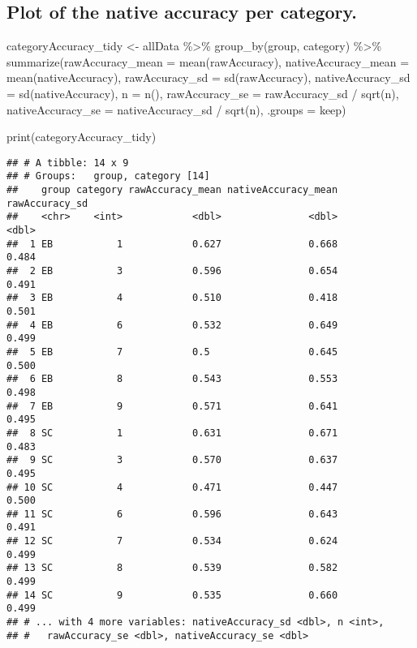 \documentclass[
]{article}
\newenvironment{Shaded}{\begin{snugshade}}{\end{snugshade}}
\newcommand{\AttributeTok}[1]{\textcolor[rgb]{0.77,0.63,0.00}{#1}}
\newcommand{\FunctionTok}[1]{\textcolor[rgb]{0.00,0.00,0.00}{#1}}
\newcommand{\NormalTok}[1]{#1}
\newcommand{\OtherTok}[1]{\textcolor[rgb]{0.56,0.35,0.01}{#1}}
\newcommand{\SpecialCharTok}[1]{\textcolor[rgb]{0.00,0.00,0.00}{#1}}
\newcommand{\StringTok}[1]{\textcolor[rgb]{0.31,0.60,0.02}{#1}}
\begin{document}
\hypertarget{plot-of-the-native-accuracy-per-category.}{%
\subsection{Plot of the native accuracy per
category.}\label{plot-of-the-native-accuracy-per-category.}}

\begin{Shaded}
\begin{Highlighting}[]
\NormalTok{categoryAccuracy\_tidy }\OtherTok{\textless{}{-}}\NormalTok{ allData }\SpecialCharTok{\%\textgreater{}\%}
  \FunctionTok{group\_by}\NormalTok{(group, category) }\SpecialCharTok{\%\textgreater{}\%}
  \FunctionTok{summarize}\NormalTok{(}\AttributeTok{rawAccuracy\_mean =} \FunctionTok{mean}\NormalTok{(rawAccuracy), }\AttributeTok{nativeAccuracy\_mean =} \FunctionTok{mean}\NormalTok{(nativeAccuracy), }
            \AttributeTok{rawAccuracy\_sd =} \FunctionTok{sd}\NormalTok{(rawAccuracy), }\AttributeTok{nativeAccuracy\_sd =} \FunctionTok{sd}\NormalTok{(nativeAccuracy),}
            \AttributeTok{n =} \FunctionTok{n}\NormalTok{(),}
            \AttributeTok{rawAccuracy\_se =}\NormalTok{ rawAccuracy\_sd }\SpecialCharTok{/} \FunctionTok{sqrt}\NormalTok{(n), }\AttributeTok{nativeAccuracy\_se =}\NormalTok{ nativeAccuracy\_sd }\SpecialCharTok{/} \FunctionTok{sqrt}\NormalTok{(n),}
            \AttributeTok{.groups =} \StringTok{\textquotesingle{}keep\textquotesingle{}}\NormalTok{)}

\FunctionTok{print}\NormalTok{(categoryAccuracy\_tidy)}
\end{Highlighting}
\end{Shaded}

\begin{verbatim}
## # A tibble: 14 x 9
## # Groups:   group, category [14]
##    group category rawAccuracy_mean nativeAccuracy_mean rawAccuracy_sd
##    <chr>    <int>            <dbl>               <dbl>          <dbl>
##  1 EB           1            0.627               0.668          0.484
##  2 EB           3            0.596               0.654          0.491
##  3 EB           4            0.510               0.418          0.501
##  4 EB           6            0.532               0.649          0.499
##  5 EB           7            0.5                 0.645          0.500
##  6 EB           8            0.543               0.553          0.498
##  7 EB           9            0.571               0.641          0.495
##  8 SC           1            0.631               0.671          0.483
##  9 SC           3            0.570               0.637          0.495
## 10 SC           4            0.471               0.447          0.500
## 11 SC           6            0.596               0.643          0.491
## 12 SC           7            0.534               0.624          0.499
## 13 SC           8            0.539               0.582          0.499
## 14 SC           9            0.535               0.660          0.499
## # ... with 4 more variables: nativeAccuracy_sd <dbl>, n <int>,
## #   rawAccuracy_se <dbl>, nativeAccuracy_se <dbl>
\end{verbatim}
\end{document}
